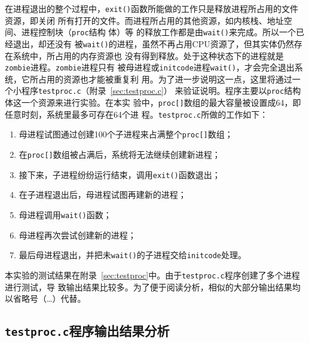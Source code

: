 \documentclass{swfuthesism}
\begin{document}
在进程退出的整个过程中，\texttt{exit()}函数所能做的工作只是释放进程所占用的文件资源，即关闭
所有打开的文件。而进程所占用的其他资源，如内核栈、地址空间、进程控制块（\texttt{proc}结构
体）等
的释放工作都是由\texttt{wait()}来完成。所以一个已经退出，却还没有
被\texttt{wait()}的进程，虽然不再占用CPU资源了，但其实体仍然存在系统中，所占用的内存资源也
没有得到释放。处于这种状态下的进程就是\texttt{zombie}进程。\texttt{zombie}进程只有
被母进程或\texttt{initcode}进程\texttt{wait()}，才会完全退出系统，它所占用的资源也才能被重复利
用。为了进一步说明这一点，这里将通过一个小程序\texttt{testproc.c}（附录~\ref{sec:testproc.c}）
来验证说明。程序主要以\texttt{proc}结构体这一个资源来进行实验。在本实
验中，\texttt{proc[]}数组的最大容量被设置成64，即任意时刻，系统里最多可存在64个进
程。\texttt{testproc.c}所做的工作如下：
\begin{enumerate}
\item 母进程试图通过创建100个子进程来占满整个\texttt{proc[]}数组；
\item 在\texttt{proc[]}数组被占满后，系统将无法继续创建新进程；
\item 接下来，子进程纷纷运行结束，调用\texttt{exit()}函数退出；
\item 在子进程退出后，母进程试图再建新的进程；
\item 母进程调用\texttt{wait()}函数；
\item 母进程再次尝试创建新的进程；
\item 最后母进程退出，并把未\texttt{wait()}的子进程交给\texttt{initcode}处理。
\end{enumerate}

本实验的测试结果在附录~\ref{sec:testproc}中。由于\texttt{testproc.c}程序创建了多个进程进行测试，导
致输出结果比较多。为了便于阅读分析，相似的大部分输出结果均以省略号（\ldots）代替。

\subsection{\texttt{testproc.c}程序输出结果分析}
\end{document}
